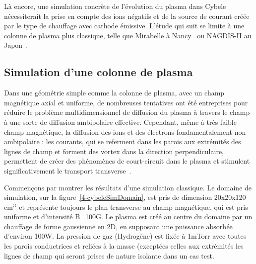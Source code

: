 \begin{refsection}
Là encore, une simulation concrète de l'évolution du plasma dans
Cybele nécessiterait la prise en compte des ions négatifs et de la source de
courant créée par le type de chauffage avec cathode émissive. L'étude qui suit
se limite à une colonne de plasma plus classique, telle que Mirabelle à
Nancy~\parencite{Mirabelle} ou NAGDIS-II au Japon~\parencite{NAGDIS1}.
 
\subsection{Simulation d'une colonne de plasma}

Dans une géométrie simple comme la colonne de plasma, avec un champ magnétique
axial et uniforme, de nombreuses tentatives ont été entreprises pour réduire le
problème multidimensionnel de diffusion du plasma à travers le champ à une
sorte de diffusion ambipolaire effective. Cependant, même à très faible champ
magnétique, la diffusion des ions et des électrons fondamentalement non
ambipolaire : les courants, qui se referment dans les parois aux extrémités des
lignes de champ et forment des vortex dans la direction perpendiculaire,
permettent de créer des phénomènes de court-circuit dans le plasma et stimulent
significativement le transport transverse~\parencite{Gurevich}.

Commençons par montrer les résultats d'une simulation classique. Le domaine de
simulation, sur la figure~\ref{4-cybeleSimDomain}, est pris de dimension
20x20x120 cm$^{{3}}$ et représente toujours le plan transverse au champ
magnétique, qui est pris uniforme et d'intensité B=100G. Le plasma est créé au
centre du domaine par un chauffage de forme gaussienne en 2D, en supposant une
puissance absorbée d'environ 100W. La pression de gaz (Hydrogène) est fixée à
1mTorr avec toutes les parois conductrices et reliées à la masse (exceptées
celles aux extrémités les lignes de champ qui seront prises de nature isolante
dans un cas test.


\end{refsection}
